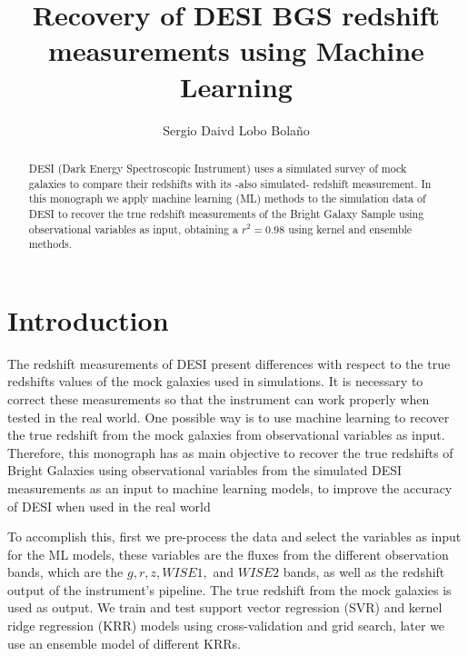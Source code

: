 \documentclass[]{article}
\title{Recovery of DESI BGS redshift measurements using Machine Learning}
\author{Sergio Daivd Lobo Bolaño}
\begin{document}
\maketitle

\begin{abstract}
DESI (Dark Energy Spectroscopic Instrument) uses a simulated survey of mock galaxies to compare their redshifts with its -also simulated- redshift measurement. In this monograph we apply machine learning (ML) methods to the simulation data of DESI to recover the true redshift measurements of the Bright Galaxy Sample using observational variables as input, obtaining a $r^2 = 0.98$ using kernel and ensemble methods. 
\end{abstract}

\section{Introduction}
The redshift measurements of DESI present differences with respect to the true redshifts values of the mock galaxies used in simulations. It is necessary to correct these measurements so that the instrument can work properly when tested in the real world. One possible way is to use machine learning to recover the true redshift from the mock galaxies from observational variables as input. Therefore, this monograph has as main objective to recover the true redshifts of Bright Galaxies using observational variables from the simulated DESI measurements as an input to machine learning models, to improve the accuracy of DESI when used in the real world 

To accomplish this, first we pre-process the data and select the variables as input for the ML models, these variables are the fluxes from the different observation bands, which are the $g, r, z, WISE 1,$ and $WISE 2$ bands, as well as the redshift output of the instrument's pipeline. The true redshift from the mock galaxies is used as output. We train and test support vector regression (SVR) and kernel ridge regression (KRR) models using cross-validation and grid search, later we use an ensemble model of different KRRs. 
 
\end{document}

